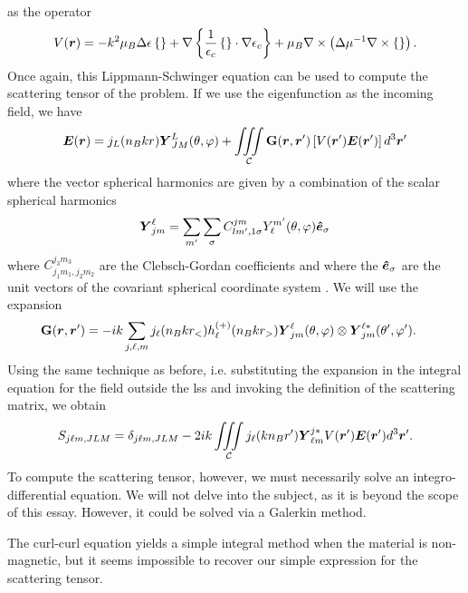 as the operator
	\begin{equation}
		V(\boldsymbol{r}) = -k^2\mu_B\Delta\epsilon\left\{\right\}
					+\nabla\left\{\frac{1}{\epsilon_c}\left\{\right\}\cdot\nabla\epsilon_c\right\}
					+\mu_B\nabla\times\left(\Delta\mu^{-1}\nabla\times\left\{\right\}\right).
	\end{equation}
Once again, this Lippmann-Schwinger equation can be used to compute the scattering tensor
of the problem. If we use the eigenfunction as the incoming field, we have
	\begin{equation}
		\boldsymbol{E}(\boldsymbol{r}) = j_L(n_Bkr)\boldsymbol{Y}^L_{JM}(\theta,\varphi)
						+\mathop{\iiint}_\mathcal{C}\mathbf{G}(\boldsymbol{r},\boldsymbol{r}')\left[V(\boldsymbol{r}')\boldsymbol{E}(\boldsymbol{r}')\right]d^3\boldsymbol{r}'
	\end{equation}
where the vector spherical harmonics are given by a combination of the
scalar spherical harmonics
	\begin{equation}
		\boldsymbol{Y}^\ell_{jm} = \sum_{m'}\sum_{\sigma}C^{jm}_{lm',1\sigma}Y_\ell^{m'}(\theta,\varphi)\boldsymbol{\hat{e}}_\sigma
	\end{equation}
where $C^{j_3m_3}_{j_1m_1,j_2m_2}$ are the Clebsch-Gordan coefficients and where
the $\boldsymbol{\hat{e}}_\sigma$ are the unit vectors of the covariant spherical coordinate system \cite{VAR1988}.
We will use the expansion
	\begin{align}
		\mathbf{G}(\boldsymbol{r},\boldsymbol{r}')	&= -ik\sum_{j,\ell,m} j_\ell(n_Bkr_<)h^{(+)}_\ell(n_Bkr_>)
													\boldsymbol{Y}^{\ell}_{jm}(\theta,\varphi)\otimes\boldsymbol{Y}^{\ell*}_{jm}(\theta',\varphi').
	\end{align}
Using the same technique as before, i.e. substituting the expansion in the integral equation
for the field outside the \gls{lss} and invoking the definition of the scattering matrix, 
we obtain
	\begin{equation}
		S_{j\ell m,JLM} = \delta_{j\ell m,JLM}
			-2ik\mathop{\iiint}_\mathcal{C}j_\ell(kn_Br')\boldsymbol{Y}^{j*}_{\ell m}V(\boldsymbol{r}')\boldsymbol{E}(\boldsymbol{r}')d^3\boldsymbol{r}'.
	\end{equation}
To compute the scattering tensor, however, we must necessarily solve an integro-differential equation.
We will not delve into the subject, as it is beyond the scope of this essay. However, 
it could be solved via a Galerkin method. 

The curl-curl equation yields a simple integral method when the material
is non-magnetic, but it seems impossible to recover our simple expression
for the scattering tensor.